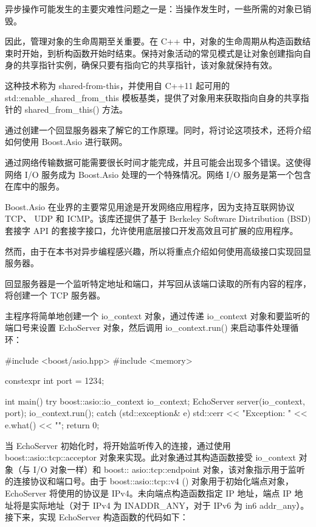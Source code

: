
异步操作可能发生的主要灾难性问题之一是：当操作发生时，一些所需的对象已销毁。

因此，管理对象的生命周期至关重要。在 C++ 中，对象的生命周期从构造函数结束时开始，到析构函数开始时结束。保持对象活动的常见模式是让对象创建指向自身的共享指针实例，确保只要有指向它的共享指针，该对象就保持有效。

这种技术称为 shared-from-this，并使用自 C++11 起可用的 std::enable\_shared\_from\_this 模板基类，提供了对象用来获取指向自身的共享指针的 shared\_from\_this() 方法。


通过创建一个回显服务器来了解它的工作原理。同时，将讨论这项技术，还将介绍如何使用 Boost.Asio 进行联网。

通过网络传输数据可能需要很长时间才能完成，并且可能会出现多个错误。这使得网络 I/O 服务成为 Boost.Asio 处理的一个特殊情况。网络 I/O 服务是第一个包含在库中的服务。

Boost.Asio 在业界的主要常见用途是开发网络应用程序，因为支持互联网协议 TCP、 UDP 和 ICMP。该库还提供了基于 Berkeley Software Distribution (BSD) 套接字 API 的套接字接口，允许使用底层接口开发高效且可扩展的应用程序。

然而，由于在本书对异步编程感兴趣，所以将重点介绍如何使用高级接口实现回显服务器。

回显服务器是一个监听特定地址和端口，并写回从该端口读取的所有内容的程序，将创建一个 TCP 服务器。

主程序将简单地创建一个 io\_context 对象，通过传递 io\_context 对象和要监听的端口号来设置 EchoServer 对象，然后调用 io\_context.run() 来启动事件处理循环：

\begin{cpp}
#include <boost/asio.hpp>
#include <memory>

constexpr int port = 1234;

int main() {
    try {
        boost::asio::io_context io_context;
        EchoServer server(io_context, port);
        io_context.run();
    } catch (std::exception& e) {
        std::cerr << "Exception: " << e.what() << "\n";
    }
    return 0;
}
\end{cpp}

当 EchoServer 初始化时，将开始监听传入的连接，通过使用 boost::asio::tcp::acceptor 对象来实现。此对象通过其构造函数接受 io\_context 对象（与 I/O 对象一样）和 boost:: asio::tcp::endpoint 对象，该对象指示用于监听的连接协议和端口号。由于 boost::asio::tcp::v4 () 对象用于初始化端点对象，EchoServer 将使用的协议是 IPv4。未向端点构造函数指定 IP 地址，端点 IP 地址将是实际地址（对于 IPv4 为 INADDR\_ANY，对于 IPv6 为 in6 addr\_any）。接下来，实现 EchoServer 构造函数的代码如下：

